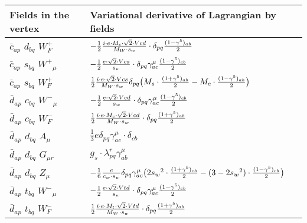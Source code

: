 \begin{center}
\begin{tabular}{|l|l|} \hline
Fields in the vertex & Variational derivative of Lagrangian by fields \\ \hline
$\bar{c}{}_{a p }$ \phantom{-} $d{}_{b q }$ \phantom{-} $W^+_F{}_{}$ \phantom{-}  &
	$-\frac{1}{2}\frac{ i \cdot e \cdot M_c \cdot\sqrt{2} \cdot Vcd}{ M_W \cdot s_w}\cdot \delta_{p q} {(1-\gamma^5)_{a b}\over 2} $\\[2mm]
$\bar{c}{}_{a p }$ \phantom{-} $s{}_{b q }$ \phantom{-} $W^+{}_{\mu }$ \phantom{-}  &
	$-\frac{1}{2}\frac{ e \cdot\sqrt{2} \cdot Vcs}{ s_w}\cdot \delta_{p q} \gamma_{a c}^\mu {(1-\gamma^5)_{c b}\over 2} $\\[2mm]
$\bar{c}{}_{a p }$ \phantom{-} $s{}_{b q }$ \phantom{-} $W^+_F{}_{}$ \phantom{-}  &
	$\frac{1}{2}\frac{ i \cdot e \cdot\sqrt{2} \cdot Vcs}{ M_W \cdot s_w}\delta_{p q} \big( M_s\cdot {(1+\gamma^5)_{a b}\over 2} - M_c\cdot {(1-\gamma^5)_{a b}\over 2} \big)$\\[2mm]
$\bar{d}{}_{a p }$ \phantom{-} $c{}_{b q }$ \phantom{-} $W^-{}_{\mu }$ \phantom{-}  &
	$-\frac{1}{2}\frac{ e \cdot\sqrt{2} \cdot Vcd}{ s_w}\cdot \delta_{p q} \gamma_{a c}^\mu {(1-\gamma^5)_{c b}\over 2} $\\[2mm]
$\bar{d}{}_{a p }$ \phantom{-} $c{}_{b q }$ \phantom{-} $W^-_F{}_{}$ \phantom{-}  &
	$\frac{1}{2}\frac{ i \cdot e \cdot M_c \cdot\sqrt{2} \cdot Vcd}{ M_W \cdot s_w}\cdot \delta_{p q} {(1+\gamma^5)_{a b}\over 2} $\\[2mm]
$\bar{d}{}_{a p }$ \phantom{-} $d{}_{b q }$ \phantom{-} ${A}_{\mu }$ \phantom{-}  &
	$\frac{1}{3} e\delta_{p q} \gamma_{a c}^\mu \cdot \delta_{c b} $\\[2mm]
$\bar{d}{}_{a p }$ \phantom{-} $d{}_{b q }$ \phantom{-} ${G}_{\mu r }$ \phantom{-}  &
	$ g_s\cdot \lambda_{p q}^r \gamma_{a b}^\mu $\\[2mm]
$\bar{d}{}_{a p }$ \phantom{-} $d{}_{b q }$ \phantom{-} ${Z}_{\mu }$ \phantom{-}  &
	$-\frac{1}{6}\frac{ e}{ c_w \cdot s_w}\delta_{p q} \gamma_{a c}^\mu \big(2 s_w{}^2 \cdot {(1+\gamma^5)_{c b}\over 2} - (3-2 s_w {}^2)\cdot {(1-\gamma^5)_{c b}\over 2} \big)$\\[2mm]
$\bar{d}{}_{a p }$ \phantom{-} $t{}_{b q }$ \phantom{-} $W^-{}_{\mu }$ \phantom{-}  &
	$-\frac{1}{2}\frac{ e \cdot\sqrt{2} \cdot Vtd}{ s_w}\cdot \delta_{p q} \gamma_{a c}^\mu {(1-\gamma^5)_{c b}\over 2} $\\[2mm]
$\bar{d}{}_{a p }$ \phantom{-} $t{}_{b q }$ \phantom{-} $W^-_F{}_{}$ \phantom{-}  &
	$\frac{1}{2}\frac{ i \cdot e \cdot M_t \cdot\sqrt{2} \cdot Vtd}{ M_W \cdot s_w}\cdot \delta_{p q} {(1+\gamma^5)_{a b}\over 2} $\\[2mm]

\end{tabular}
\end{center}

